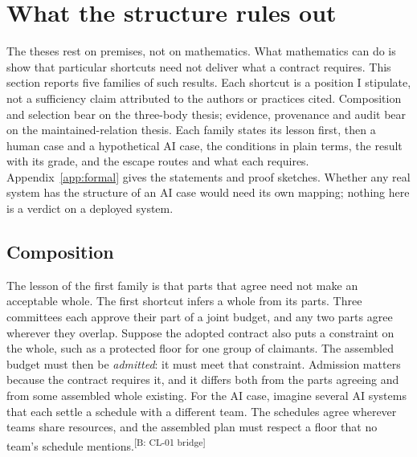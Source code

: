 \documentclass[pdflatex,sn-basic]{sn-jnl}%
\newcommand{\slot}[1]{}%
\newcommand{\claim}[2]{\ifannotated\textsuperscript{\textcolor{blue!60!black}{\tiny[#1: #2]}}\fi}
\begin{document}
\section{What the structure rules out}\label{sec:rules-out}
The theses rest on premises, not on mathematics. What mathematics can do is show that particular shortcuts need not deliver what a contract requires. This section reports five families of such results. Each shortcut is a position I stipulate, not a sufficiency claim attributed to the authors or practices cited. Composition and selection bear on the three-body thesis; evidence, provenance and audit bear on the maintained-relation thesis. Each family states its lesson first, then a human case and a hypothetical AI case, the conditions in plain terms, the result with its grade, and the escape routes and what each requires. Appendix~\ref{app:formal} gives the statements and proof sketches. Whether any real system has the structure of an AI case would need its own mapping; nothing here is a verdict on a deployed system.

\subsection{Composition}\label{sec:composition}

\slot{5.1}
The lesson of the first family is that parts that agree need not make an acceptable whole. The first shortcut infers a whole from its parts. Three committees each approve their part of a joint budget, and any two parts agree wherever they overlap. Suppose the adopted contract also puts a constraint on the whole, such as a protected floor for one group of claimants. The assembled budget must then be \emph{admitted}: it must meet that constraint. Admission matters because the contract requires it, and it differs both from the parts agreeing and from some assembled whole existing. For the AI case, imagine several AI systems that each settle a schedule with a different team. The schedules agree wherever teams share resources, and the assembled plan must respect a floor that no team's schedule mentions.\claim{B}{CL-01 bridge}
\end{document}
